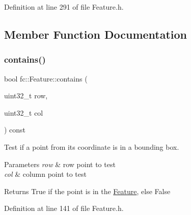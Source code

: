 Definition at line 291 of file Feature.\+h.



\subsection{Member Function Documentation}
\mbox{\label{classfc_1_1Feature_ae1c529caa66d56edfb361431a832f806}} 
\subsubsection{\texorpdfstring{contains()}{contains()}\hspace{0.1cm}{\footnotesize\ttfamily [1/2]}}
{\footnotesize\ttfamily bool fc\+::\+Feature\+::contains (\begin{DoxyParamCaption}\item[{uint32\+\_\+t}]{row,  }\item[{uint32\+\_\+t}]{col }\end{DoxyParamCaption}) const\hspace{0.3cm}{\ttfamily [inline]}}



Test if a point from its coordinate is in a bounding box. 


\begin{DoxyParams}{Parameters}
{\em row} & row point to test \\
\hline
{\em col} & column point to test \\
\hline
\end{DoxyParams}
\begin{DoxyReturn}{Returns}
True if the point is in the \hyperlink{classfc_1_1Feature}{Feature}, else False 
\end{DoxyReturn}


Definition at line 141 of file Feature.\+h.

